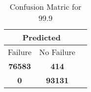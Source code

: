 \begin{table}[] 
\caption{Confusion Matric for 99.9} 
\label{Table: Prediction Accuracy-DMD99.9OnlySunEKF-ignoreReflectionEKF-top2-Reflection} 
\centering 
\begin{tabular} 
 {@{}ccc@{}} 
\toprule 
\multicolumn{2}{c}{\textbf{Predicted}}
 \\ \midrule 
\multicolumn{1}{|c|}{Failure} & 
\multicolumn{1}{c|}{No Failure}
 \\ \midrule 
\multicolumn{1}{|c|}{\color{green}\textbf{76583}} & 
\multicolumn{1}{c|}{\color{red}\textbf{414}}
 \\ \midrule 
\multicolumn{1}{|c|}{\color{red}\textbf{0}} & 
\multicolumn{1}{c|}{\color{green}\textbf{93131}}
 \\ \bottomrule 
\end{tabular} 
\end{table} 
